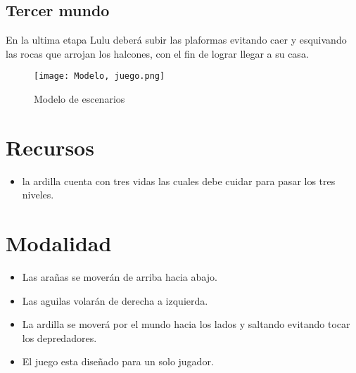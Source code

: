 \documentclass{article}
\begin{document}
\subsection{Tercer mundo}
En la ultima etapa Lulu deberá subir las plaformas evitando caer y esquivando las rocas que arrojan los halcones, con el fin de lograr llegar a su casa. 

\vspace{0.5cm}


\begin{figure}[h]
\texttt{[image: Modelo, juego.png]}
\centering
\caption{Modelo de escenarios}
\label{fig:Modelo, juego}
\end{figure}


\section{Recursos}
\begin{itemize}
    \item la ardilla cuenta con tres vidas las cuales debe cuidar para pasar los tres niveles. 
    
\end{itemize}

\newpage

\section{Modalidad}
\begin{itemize}

    \item Las arañas se moverán de arriba hacia abajo.
    \item Las aguilas volarán de derecha a izquierda.
    \item La ardilla se moverá por el mundo hacia los lados y saltando evitando tocar los depredadores.
    \item El juego esta diseñado para un solo jugador.
\end{itemize}
\end{document}
